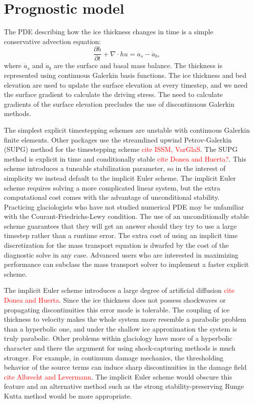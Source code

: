 \documentclass{article}
\theoremstyle{definition}
\theoremstyle{plain}
\begin{document}
\section{Prognostic model} \label{sec:prognostic-model}

The PDE describing how the ice thickness changes in time is a simple conservative advection equation:
\begin{equation}
    \frac{\partial h}{\partial t} + \nabla\cdot hu = \dot a_s - \dot a_b,
\end{equation}
where $\dot a_s$ and $\dot a_b$ are the surface and basal mass balance.
The thickness is represented using continuous Galerkin basis functions.
The ice thickness and bed elevation are used to update the surface elevation at every timestep, and we need the surface gradient to calculate the driving stress.
The need to calculate gradients of the surface elevation precludes the use of discontinuous Galerkin methods.

The simplest explicit timestepping schemes are unstable with continuous Galerkin finite elements.
Other packages use the streamlined upwind Petrov-Galerkin (SUPG) method for the timestepping scheme \textcolor{red}{cite ISSM, VarGlaS}.
The SUPG method is explicit in time and conditionally stable \textcolor{red}{cite Donea and Huerta?}.
This scheme introduces a tuneable stabilization parameter, so in the interest of simplicity we instead default to the implicit Euler scheme.
The implicit Euler scheme requires solving a more complicated linear system, but the extra computational cost comes with the advantage of unconditional stability.
Practicing glaciologists who have not studied numerical PDE may be unfamiliar with the Courant-Friedrichs-Lewy condition.
The use of an unconditionally stable scheme guarantees that they will get an answer should they try to use a large timestep rather than a runtime error.
The extra cost of using an implicit time discretization for the mass transport equation is dwarfed by the cost of the diagnostic solve in any case.
Advanced users who are interested in maximizing performance can subclass the mass transport solver to implement a faster explicit scheme.

The implicit Euler scheme introduces a large degree of artificial diffusion \textcolor{red}{cite Donea and Huerta}.
Since the ice thickness does not possess shockwaves or propagating discontinuities this error mode is tolerable.
The coupling of ice thickness to velocity makes the whole system more resemble a parabolic problem than a hyperbolic one, and under the shallow ice approximation the system is truly parabolic.
Other problems within glaciology have more of a hyperbolic character and there the argument for using shock-capturing methods is much stronger.
For example, in continuum damage mechanics, the thresholding behavior of the source terms can induce sharp discontinuities in the damage field \textcolor{red}{cite Albrecht and Levermann}.
The implicit Euler scheme would obscure this feature and an alternative method such as the strong stability-preserving Runge Kutta method would be more appropriate.
\end{document}
